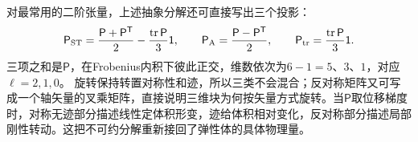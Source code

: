 对最常用的二阶张量，上述抽象分解还可直接写出三个投影：
\[
 \mathsf P_{\rm ST}=\frac{\mathsf P+\mathsf P^{\mathsf T}}2
          -\frac{\operatorname{tr}\mathsf P}{3}\mathsf1,\qquad
 \mathsf P_{\rm A}=\frac{\mathsf P-\mathsf P^{\mathsf T}}2,\qquad
 \mathsf P_{\rm tr}=\frac{\operatorname{tr}\mathsf P}{3}\mathsf1.
\]
三项之和是$\mathsf P$，在Frobenius内积下彼此正交，维数依次为$6-1=5$、$3$、$1$，对应$\ell=2,1,0$。
旋转保持转置对称性和迹，所以三类不会混合；反对称矩阵又可写成一个轴矢量的叉乘矩阵，直接说明三维块为何按矢量方式旋转。当$\mathsf P$取位移梯度时，对称无迹部分描述线性定体积形变，迹给体积相对变化，反对称部分描述局部刚性转动。这把不可约分解重新接回了弹性体的具体物理量。

